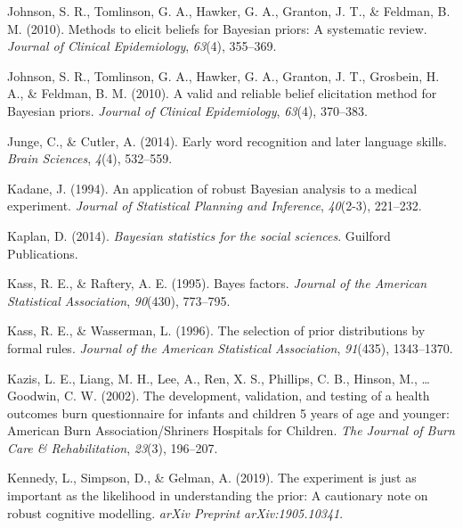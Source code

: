 \documentclass[openright,titlepage,12pt,a4paper]{book}
\begin{document}
\leavevmode\hypertarget{ref-johnson_methods_2010}{}%
Johnson, S. R., Tomlinson, G. A., Hawker, G. A., Granton, J. T., \& Feldman, B. M. (2010). Methods to elicit beliefs for Bayesian priors: A systematic review. \emph{Journal of Clinical Epidemiology}, \emph{63}(4), 355--369.

\leavevmode\hypertarget{ref-johnson_valid_2010}{}%
Johnson, S. R., Tomlinson, G. A., Hawker, G. A., Granton, J. T., Grosbein, H. A., \& Feldman, B. M. (2010). A valid and reliable belief elicitation method for Bayesian priors. \emph{Journal of Clinical Epidemiology}, \emph{63}(4), 370--383.

\leavevmode\hypertarget{ref-junge_early_2014}{}%
Junge, C., \& Cutler, A. (2014). Early word recognition and later language skills. \emph{Brain Sciences}, \emph{4}(4), 532--559.

\leavevmode\hypertarget{ref-kadane_application_1994}{}%
Kadane, J. (1994). An application of robust Bayesian analysis to a medical experiment. \emph{Journal of Statistical Planning and Inference}, \emph{40}(2-3), 221--232.

\leavevmode\hypertarget{ref-kaplan_bayesian_2014}{}%
Kaplan, D. (2014). \emph{Bayesian statistics for the social sciences}. Guilford Publications.

\leavevmode\hypertarget{ref-kass_bayes_1995}{}%
Kass, R. E., \& Raftery, A. E. (1995). Bayes factors. \emph{Journal of the American Statistical Association}, \emph{90}(430), 773--795.

\leavevmode\hypertarget{ref-kass_selection_1996}{}%
Kass, R. E., \& Wasserman, L. (1996). The selection of prior distributions by formal rules. \emph{Journal of the American Statistical Association}, \emph{91}(435), 1343--1370.

\leavevmode\hypertarget{ref-kazis_development_2002}{}%
Kazis, L. E., Liang, M. H., Lee, A., Ren, X. S., Phillips, C. B., Hinson, M., \ldots{} Goodwin, C. W. (2002). The development, validation, and testing of a health outcomes burn questionnaire for infants and children 5 years of age and younger: American Burn Association/Shriners Hospitals for Children. \emph{The Journal of Burn Care \& Rehabilitation}, \emph{23}(3), 196--207.

\leavevmode\hypertarget{ref-kennedy_experiment_2019}{}%
Kennedy, L., Simpson, D., \& Gelman, A. (2019). The experiment is just as important as the likelihood in understanding the prior: A cautionary note on robust cognitive modelling. \emph{arXiv Preprint arXiv:1905.10341}.
\end{document}
